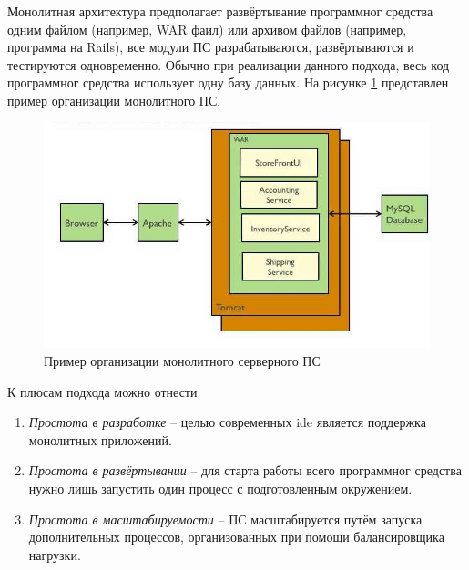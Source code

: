 \subsubsection {}
\label{sec:analysis:research:backArch:monolith}

Монолитная архитектура предполагает развёртывание программног средства одним файлом (например, WAR фаил) или архивом файлов (например, программа на Rails), все модули ПС разрабатываются, развёртываются и тестируются одновременно. Обычно при реализации данного подхода, весь код программног средства использует одну базу данных. На рисунке \ref{sec:analysis:research:arch:back:monolith} представлен пример организации монолитного ПС\cite{microservices:ma}.

\begin{figure}[h]
  \centering
    \includegraphics[width=1\textwidth]{inc/img/backend-monolith.jpg}
  \caption{Пример организации монолитного серверного ПС}
  \label{sec:analysis:research:arch:back:monolith}
\end{figure}

К плюсам подхода можно отнести:

\begin{enumerate}
	\item \emph{Простота в разработке} -- целью современных \gls{ide} является поддержка монолитных приложений.
	\item \emph{Простота в развёртывании} -- для старта работы всего программног средства нужно лишь запустить один процесс с подготовленным окружением.
	\item \emph{Простота в масштабируемости} -- ПС масштабируется путём запуска дополнительных процессов, организованных при помощи балансировщика нагрузки.
\end{enumerate}

